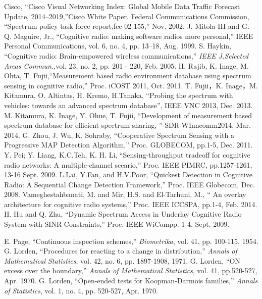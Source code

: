 \begin{thebibliography}{99}
Cisco, ``Cisco Visual Networking Index: Global Mobile Data Traffic Forecast Update, 2014–2019,''Cisco White Paper.
Federal Communications Commission, ``Spectrum policy task force report,fcc 02-155,'' Nov. 2002.
J. Mitola III and G. Q. Maguire, Jr., ``Cognitive radio: making software radios more personal,'' IEEE Personal Communications, vol. 6, no. 4, pp. 13–18, Aug. 1999.
 S. Haykin, ``Cognitive radio: Brain-empowered wireless communications,'' {\it IEEE J.Selected Areas Commun.},vol. 23, no. 2, pp. 201 - 220, Feb. 2005.
H. Rajib, K. Inage, M. Ohta, T. Fujii,``Measurement based radio environment database using spectrum sensing in cognitive radio,'' Proc. iCOST 2011, Oct. 2011.
T. Fujii，K. Inage，M. Kitamura, O. Altintas, H. Kremo, H.Tanaka, ``Probing the spectrum with vehicles: towards an advanced spectrum database'', IEEE VNC 2013, Dec. 2013.
M. Kitamura, K. Inage, Y. Ohue, T. Fujii, ``Development of measurement based spectrum database for efficient spectrum sharing, '' SDR-WInncomm2014, Mar. 2014.
G. Zhou, J. Wu, K. Sohraby, ``Cooperative Spectrum Sensing with a Progressive MAP Detection Algorithm,'' Proc. GLOBECOM, pp.1-5, Dec. 2011.
Y. Pei; Y. Liang, K.C.Teh, K. H. Li, ``Sensing-throughput tradeoff for cognitive radio networks: A multiple-channel sceario,'' Proc. IEEE PIMRC, pp.1257-1261, 13-16 Sept. 2009.
L.Lai, Y.Fan, and H.V.Poor, ``Quickest Detection in Cognitive Radio: A Sequential Change Detection Framework,'' Proc. IEEE Globecom, Dec. 2008.
Vameghestahbanati, M. and Mir, H.S. and El-Tarhuni, M., `` An overlay architecture for cognitive radio systems,'' Proc. IEEE ICCSPA, pp.1-4, Feb. 2014.
H. Hu and Q. Zhu, ``Dynamic Spectrum Access in Underlay Cognitive Radio System with SINR Constraints,'' Proc. IEEE WiCompp. 1-4, Sept. 2009.

E. Page, ``Continuous inspection schemes,'' {\it Biometrika}, vol. 41, pp. 100-115, 1954.
G. Lorden, ``Procedures for reacting to a change in distribution,'' {\it Annals of Mathematical Statistics}, vol. 42, no. 6, pp. 1897-1908, 1971.  
G. Lorden, ``ON excess over the boundary,'' {\it Annals of Mathematical Statistics}, vol. 41, pp.520-527, Apr. 1970.
G. Lorden, ``Open-ended tests for Koopman-Darmois families,'' {\it Annals of Statistics}, vol. 1, no. 4, pp. 520-527, Apr. 1970.
\end{thebibliography}
